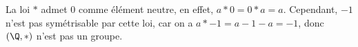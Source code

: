 La loi $\ast$ admet 0 comme élément neutre, en effet, $a \ast 0 = 0 \ast a = a$. Cependant, $-1$ n'est pas symétrisable par cette loi, car on a $a \ast -1 = a -1 -a = -1$, donc $(\Q, \ast)$ n'est pas un groupe.